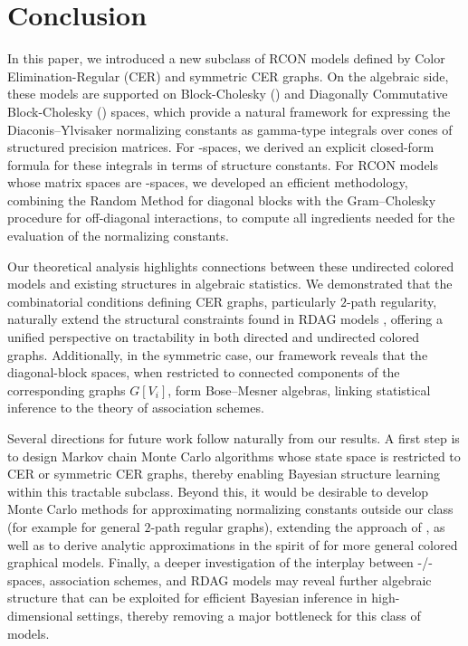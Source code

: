 \documentclass[12pt]{amsart}
\theoremstyle{plain}
\theoremstyle{definition}
\theoremstyle{remark}
\newcommand{\1}{\mathbf{1}}
\begin{document}
\section{Conclusion}\label{sec:conclusion}


In this paper, we introduced a new subclass of RCON models \citep{HL08} defined by Color Elimination-Regular (CER) and symmetric CER graphs. On the algebraic side, these models are supported on Block-Cholesky (\BC) and Diagonally Commutative Block-Cholesky (\cBC) spaces, which provide a natural framework for expressing the Diaconis--Ylvisaker normalizing constants as gamma-type integrals over cones of structured precision matrices. For \BC-spaces, we derived an explicit closed-form formula
for these integrals in terms of structure constants.
For RCON models whose matrix spaces are \cBC-spaces, we developed
an efficient methodology, combining the Random Method for diagonal
blocks with the Gram--Cholesky procedure for off-diagonal interactions,
to compute all ingredients needed for the evaluation of the
normalizing constants.

Our theoretical analysis highlights connections between these undirected colored models and existing structures in algebraic statistics. We demonstrated that the combinatorial conditions defining CER graphs, particularly $2$-path regularity, naturally extend the structural constraints found in RDAG models \citep{Seigal23}, offering a unified perspective on tractability in both directed and undirected colored graphs. Additionally, in the symmetric case, our framework reveals that the diagonal-block spaces, when restricted to connected components of the corresponding graphs $G[V_i]$, form Bose--Mesner algebras, linking statistical inference to the theory of association schemes.

Several directions for future work follow naturally from our results. A first step is to design Markov chain Monte Carlo algorithms whose state space is restricted to CER or symmetric CER graphs, thereby enabling Bayesian structure learning within this tractable subclass. Beyond this, it would be desirable to develop Monte Carlo methods for approximating normalizing constants outside our class (for example for general $2$-path regular graphs), extending the approach of \citet{A-KM05}, as well as to derive analytic approximations in the spirit of \citet{MML23} for more general colored graphical models. Finally, a deeper investigation of the interplay between \BC-/\cBC-spaces, association schemes, and RDAG models may reveal further algebraic structure that can be exploited for efficient Bayesian inference in high-dimensional settings, thereby removing a major bottleneck for this class of models.
\end{document}

